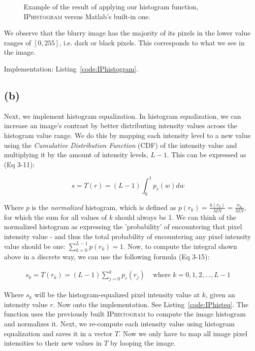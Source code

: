 \documentclass{article}
\begin{document}
\begin{figure}[ht]
    \centering
    
    \caption{Example of the result of applying our histogram function, \textsc{IPhistogram} versus Matlab's built-in one.}
    \label{fig:histogram}
\end{figure}

We observe that the blurry image has the majority of its pixels in the lower value ranges of $[0, 255]$, i.e. dark or black pixels. This corresponds to what we see in the image.

 Implementation: Listing~\ref{code:IPhistogram}.

\subsection*{(b)} Next, we implement histogram equalization. In histogram equalization, we can increase an image's contrast by better distributing intensity values across the histogram value range. We do this by mapping each intensity level to a new value using the \textit{Cumulative Distribution Function} (CDF) of the intensity value and multiplying it by the amount of intensity levels, $L - 1$. This can be expressed as (Eq 3-11):

\[
s=T(r)=(L-1)\int_{0}^{1} p_r(w)dw
\]

Where $p$ is the \textit{normalized} histogram, which is defined as $p(r_k)=\frac{h(r_k)}{MN}=\frac{n_k}{MN}$, for which the sum for all values of $k$ should always be 1. We can think of the normalized histogram as expressing the 'probability' of encountering that pixel intensity value - and thus the total probability of encountering any pixel intensity value should be one: $\sum_{k=0}^{L-1}p(r_k)=1$. Now, to compute the integral shown above in a discrete way, we can use the following formula (Eq 3-15):

\[
\begin{aligned}
s_k=T(r_k)=(L-1)\sum_{j=0}^{k}p_r(r_j) & \text{ where $k=0,1,2,...,L-1$}
\end{aligned}
\]

Where $s_k$ will be the histogram-equalized pixel intensity value at $k$, given an intensity value $r$. Now onto the implementation. See  Listing~\ref{code:IPhisteq}. The function uses the previously built \textsc{IPhistogram} to compute the image histogram and normalizes it. Next, we re-compute each intensity value using histogram equalization and saves it in a vector $T$. Now we only have to map all image pixel intensities to their new values in $T$ by looping the image.
\end{document}
